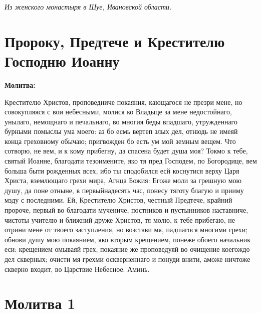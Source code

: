 \longpage{}\itshape Из женского монастыря в Шуе, Ивановской области.\normalfont{} 


\section{Пророку, Предтече и Крестителю Господню Иоанну}
 
\bfseries Молитва:\normalfont{}


Крестителю Христов, проповедниче покаяния, кающагося не презри мене, но совокупляяся с вои небесными, молися ко Владыце за мене недостойнаго, унылаго, немощнаго и печальнаго, во многия беды впадшаго, утружденнаго бурными помыслы ума моего: аз бо есмь вертеп злых дел, отнюдь не имеяй конца греховному обычаю; пригвожден бо есть ум мой земным вещем. Что сотворю, не вем, и к кому прибегну, да спасена будет душа моя? Токмо к тебе, святый Иоанне, благодати тезоимените, яко тя пред Господем, по Богородице, вем больша быти рожденных всех, ибо ты сподобился есй коснутися верху Царя Христа, вземлющаго грехи мира, Агнца Божия: Егоже моли за грешную мою душу, да поне отныне, в первыйнадесять час, понесу тяготу благую и прииму мзду с последними. Ей, Крестителю Христов, честный Предтече, крайний пророче, первый во благодати мучениче, постников и пустынников наставниче, чистоты учителю и ближний друже Христов, тя молю, к тебе прибегаю, не отрини мене от твоего заступления, но возстави мя, падшагося многими грехи; обнови душу мою покаянием, яко вторым крещением, понеже обоего начальник еси: крещением омываяй грех, покаяние же проповедуяй во очищение коегождо дел скверных; очисти мя грехми оскверненнаго и понуди внити, аможе ничтоже скверно входит, во Царствие Небесное. Аминь.

\section{Молитва 1}
 


